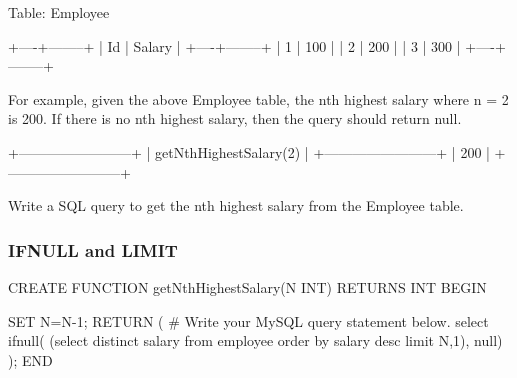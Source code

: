 Table: Employee
\begin{Code}
+----+--------+
| Id | Salary |
+----+--------+
| 1  | 100    |
| 2  | 200    |
| 3  | 300    |
+----+--------+
\end{Code}

For example, given the above Employee table, the nth highest salary where n = 2 is 200. If there is no nth highest salary, then the query should return null.
\begin{Code}
+------------------------+
| getNthHighestSalary(2) |
+------------------------+
| 200                    |
+------------------------+
\end{Code}

Write a SQL query to get the nth highest salary from the Employee table.

\subsubsection{IFNULL and LIMIT}
\begin{Code}
CREATE FUNCTION getNthHighestSalary(N INT) RETURNS INT
BEGIN

SET N=N-1;
  RETURN (
      # Write your MySQL query statement below.
      select
          ifnull(
              (select distinct
                   salary
               from
                   employee
               order by  salary desc
               limit N,1),
          null)
  );
END
\end{Code}